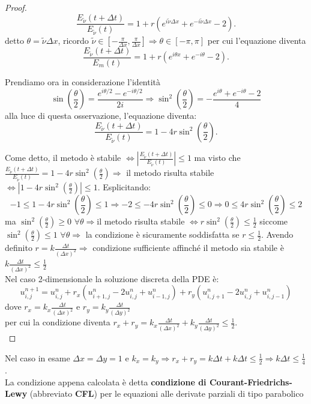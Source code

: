 \begin{proof}
$$
\frac {E_{\tilde{\nu}}(t+\Delta t)}{E_{\tilde{\nu}}(t)}=1+r(e^{i\tilde{\nu}\Delta x}+e^{-i\tilde{\nu}\Delta x}-2).
$$
detto $\theta =\tilde{\nu}\Delta x$, ricordo $\tilde{\nu}\in [-\frac{\pi}{\Delta x},\frac{\pi}{\Delta x}] \Rightarrow \theta \in [-\pi ,\pi ]$
per cui l'equazione diventa
$$
\frac {E_{\tilde{\nu}}(t+\Delta t)}{E_{m}(t)}=1+r(e^{i\theta x}+e^{-i\theta}-2).
$$

Prendiamo ora in considerazione l'identità 
$$
\sin \left({\frac {\theta }{2}}\right)={\frac {e^{i\theta /2}-e^{-i\theta /2}}{2i}} \Rightarrow
\sin ^{2}\left({\frac {\theta }{2}}\right)=-{\frac {e^{i\theta }+e^{-i\theta }-2}{4}}
$$
alla luce di questa osservazione, l'equazione diventa:
$$
\frac {E_{\tilde{\nu}}(t+\Delta t)}{E_{\tilde{\nu}}(t)}=1-4r\sin^2(\frac{\theta}{2}).
$$

Come detto, il metodo è stabile $\Leftrightarrow|\frac{E_{\tilde{\nu}}(t+\Delta t)}{E_{\tilde{\nu}}(t)}|\leq 1$ ma visto che $\frac {E_{\tilde{\nu}}(t+\Delta t)}{E_{\tilde{\nu}}(t)}=1-4r\sin^2(\frac{\theta}{2})\Rightarrow$ il metodo risulta stabile $\Leftrightarrow|1-4r\sin^2(\frac{\theta}{2})|\leq1$. Esplicitando:
$$
-1\leq 1-4r\sin^2(\frac{\theta}{2})\leq 1 \Rightarrow-2\leq -4r\sin^2(\frac{\theta}{2})\leq 0 \Rightarrow 0\leq 4r\sin^2(\frac{\theta}{2})\leq 2
$$
ma $\sin^2(\frac{\theta}{2})\ge0$ $\forall\theta\Rightarrow$il metodo risulta stabile $\Leftrightarrow r\sin^2(\frac{\theta}{2})\leq\frac{1}{2}$ siccome $\sin^2(\frac{\theta}{2})\leq1$ $\forall\theta\Rightarrow$ la condizione è sicuramente soddisfatta se $r\leq\frac{1}{2}$.
Avendo definito $r=k \frac{\Delta t}{(\Delta x)^2} \Rightarrow$ condizione sufficiente affinché il metodo sia stabile è $k \frac{\Delta t}{(\Delta x)^2}\leq\frac{1}{2}$\\
\vspace{1em}
Nel caso 2-dimensionale la soluzione discreta della PDE è:
$$
u_{i,j}^{n+1}=u_{i,j}^{n}+r_{x}(u_{i+1,j}^{n}-2u_{i,j}^{n}+u_{i-1,j}^{n})+r_{y}(u_{i,j+1}^{n}-2u_{i,j}^{n}+u_{i,j-1}^{n})
$$
dove $r_{x}=k_x \frac{\Delta t}{(\Delta x)^2}$ e $r_{y}=k_y \frac{\Delta t}{(\Delta y)^2}$\\ per cui la condizione diventa $r_{x}+r_{y}=k_x \frac{\Delta t}{(\Delta x)^2}+k_y \frac{\Delta t}{(\Delta y)^2}\leq\frac{1}{2}$.\\

\end{proof}
Nel caso in esame $\Delta x=\Delta y=1$ e $ k_x=k_y \Rightarrow r_{x}+r_{y}=k \Delta t+k \Delta t\leq\frac{1}{2} \Rightarrow k\Delta t\leq \frac{1}{4}$.\\
\vspace{0.5em}
La condizione appena calcolata è detta \textbf{condizione di Courant-Friedrichs-Lewy} (abbreviato \textbf{CFL}) per le equazioni alle derivate parziali di tipo parabolico
